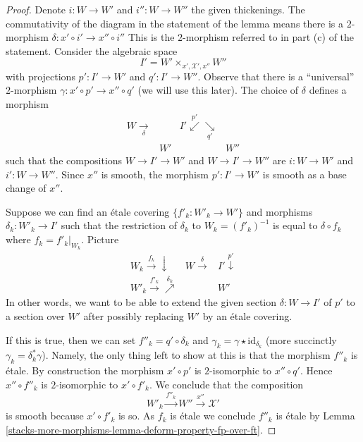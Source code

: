\begin{proof}
Denote $i : W \to W'$ and $i'' : W \to W''$ the given thickenings.
The commutativity of the diagram in the statement of the lemma
means there is a $2$-morphism $\delta : x' \circ i' \to x'' \circ i''$
This is the $2$-morphism referred to in part (c) of the statement.
Consider the algebraic space
$$
I' = W' \times_{x', \mathcal{X}', x''} W''
$$
with projections $p' : I' \to W'$ and $q' : I' \to W''$.
Observe that there is a ``universal'' $2$-morphism
$\gamma : x' \circ p' \to x'' \circ q'$ (we will use this later).
The choice of $\delta$ defines a morphism
$$
\begin{array}{cccc}W \underset{\delta}{\longrightarrow} &  & I' \overset{p'}{\swarrow}\underset{q'}{\searrow} &  \\  & W' &  & W''\end{array}
$$
such that the compositions $W \to I' \to W'$ and $W \to I' \to W''$
are $i : W \to W'$ and $i' : W \to W''$.
Since $x''$ is smooth, the morphism $p' : I' \to W'$ is smooth
as a base change of $x''$.

\medskip\noindent
Suppose we can find an \'etale covering $\{f'_k : W'_k \to W'\}$
and morphisms $\delta_k : W'_k \to I'$ such that the restriction
of $\delta_k$ to $W_k = (f'_k)^{-1}$ is equal to $\delta \circ f_k$
where $f_k = f'_k|_{W_k}$. Picture
$$
\begin{array}{ccc}W_k \overset{f_k}{\longrightarrow}\downarrow & W \overset{\delta}{\longrightarrow} & I' \overset{p'}{\downarrow} \\ W'_k \overset{f'_k}{\longrightarrow}\overset{\delta_k}{\nearrow} &  & W'\end{array}
$$
In other words, we want to be able to extend the given section
$\delta : W \to I'$ of $p'$ to a section over $W'$ after possibly
replacing $W'$ by an \'etale covering.

\medskip\noindent
If this is true, then we can set $f''_k = q' \circ \delta_k$
and $\gamma_k = \gamma \star \text{id}_{\delta_k}$ (more succinctly
$\gamma_k = \delta_k^*\gamma$). Namely, the only thing left to show
at this is that the morphism $f''_k$ is \'etale.
By construction the morphism $x' \circ p'$ is $2$-isomorphic
to $x'' \circ q'$. Hence $x'' \circ f''_k$ is $2$-isomorphic
to $x' \circ f'_k$. We conclude that the composition
$$
W'_k \xrightarrow{f''_k} W'' \xrightarrow{x''} \mathcal{X}'
$$
is smooth because $x' \circ f'_k$ is so.
As $f_k$ is \'etale we conclude $f''_k$ is \'etale
by Lemma \ref{stacks-more-morphisms-lemma-deform-property-fp-over-ft}.


\end{proof}
